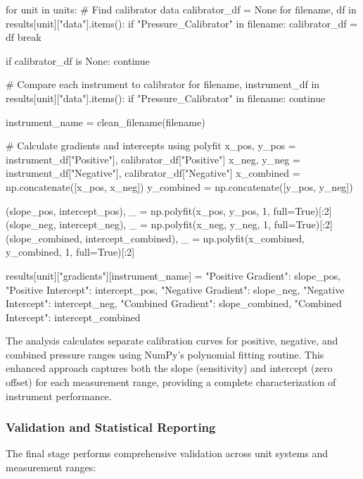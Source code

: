 \documentclass{article}
\begin{document}
\begin{python}
for unit in units:
    # Find calibrator data
    calibrator_df = None
    for filename, df in results[unit]["data"].items():
        if "Pressure_Calibrator" in filename:
            calibrator_df = df
            break
    
    if calibrator_df is None:
        continue
    
    # Compare each instrument to calibrator
    for filename, instrument_df in results[unit]["data"].items():
        if "Pressure_Calibrator" in filename:
            continue
            
        instrument_name = clean_filename(filename)
        
        # Calculate gradients and intercepts using polyfit
        x_pos, y_pos = instrument_df["Positive"], calibrator_df["Positive"]
        x_neg, y_neg = instrument_df["Negative"], calibrator_df["Negative"]
        x_combined = np.concatenate([x_pos, x_neg])
        y_combined = np.concatenate([y_pos, y_neg])
        
        (slope_pos, intercept_pos), _ = np.polyfit(x_pos, y_pos, 1, full=True)[:2]
        (slope_neg, intercept_neg), _ = np.polyfit(x_neg, y_neg, 1, full=True)[:2]
        (slope_combined, intercept_combined), _ = np.polyfit(x_combined, y_combined, 1, full=True)[:2]
        
        results[unit]["gradients"][instrument_name] = {
            "Positive Gradient": slope_pos,
            "Positive Intercept": intercept_pos,
            "Negative Gradient": slope_neg,
            "Negative Intercept": intercept_neg,
            "Combined Gradient": slope_combined,
            "Combined Intercept": intercept_combined
        }
\end{python}

The analysis calculates separate calibration curves for positive, negative, and combined pressure ranges using NumPy's polynomial fitting routine. This enhanced approach captures both the slope (sensitivity) and intercept (zero offset) for each measurement range, providing a complete characterization of instrument performance.

\subsubsection{Validation and Statistical Reporting}
The final stage performs comprehensive validation across unit systems and measurement ranges:
\end{document}
